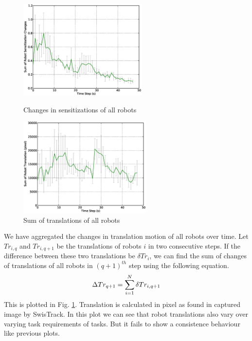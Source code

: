 \documentclass{llncs}
\begin{document}
\begin{figure}
\begin{minipage}[t]{0.5\linewidth}
\centering
\includegraphics[height=5cm, angle=0]
{images/global/RobotSensitizationStat-Total-50steps.eps}
\caption{\small Changes in sensitizations of all robots}
\label{fig:sensitization-stat} %
\end{minipage}
\hspace{0.5cm}
\begin{minipage}[t]{0.5\linewidth}
\centering
\includegraphics[height=5cm, angle=0]{images/global/DeltaTranslationStat.eps}
\caption{\small Sum of translations of all robots }
\label{fig:translation-stat} %
\end{minipage}
\end{figure}
We have aggregated the changes in translation motion of all robots over time. Let $Tr_{i,q}$ and $Tr_{i,q+1}$ be the translations of robots $i$ in two consecutive steps. If the difference between these two translations be $\delta Tr_{i}$, we can find the sum of changes of translations of all robots in $(q+1)^{th}$ step using the following equation.
\begin{equation}
\small 
\Delta Tr_{q+1} = \sum_{i=1}^{N} \delta Tr_{i, q+1} 
\label{eqn:Delta-Tr}
\end{equation}
This is plotted in Fig. \ref{fig:translation-stat}. Translation is calculated in pixel as found in captured image by SwisTrack. In this plot we can see that robot translations also vary over varying task requirements of tasks. But it fails to show a consistence behaviour like previous plots.\\
\end{document}
